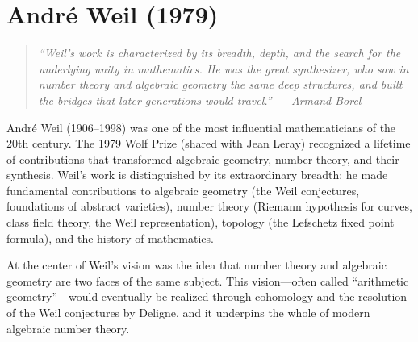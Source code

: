 \let\im\relax
\newcommand{\im}{\operatorname{im}}
\let\coker\relax
\newcommand{\coker}{\operatorname{coker}}
\let\Spec\relax
\newcommand{\Spec}{\operatorname{Spec}}
\let\Proj\relax
\newcommand{\Proj}{\operatorname{Proj}}
\let\Pic\relax
\newcommand{\Pic}{\operatorname{Pic}}
\let\Div\relax
\newcommand{\Div}{\operatorname{Div}}
\let\Gal\relax
\newcommand{\Gal}{\operatorname{Gal}}
\let\Frob\relax
\newcommand{\Frob}{\operatorname{Frob}}
\let\Cl\relax
\newcommand{\Cl}{\operatorname{Cl}}
\let\SL\relax
\newcommand{\SL}{\operatorname{SL}}
\let\GL\relax
\newcommand{\GL}{\operatorname{GL}}
\let\Sp\relax
\newcommand{\Sp}{\operatorname{Sp}}
\let\Sym\relax
\newcommand{\Sym}{\operatorname{Sym}}
\let\Norm\relax
\newcommand{\Norm}{\operatorname{Norm}}
\let\N\relax
\newcommand{\N}{\mathbb{N}}
\let\R\relax
\newcommand{\R}{\mathbb{R}}
\let\C\relax
\newcommand{\C}{\mathbb{C}}
\let\Q\relax
\newcommand{\Q}{\mathbb{Q}}
\let\Z\relax
\newcommand{\Z}{\mathbb{Z}}
\let\F\relax
\newcommand{\F}{\mathbb{F}}
\let\A\relax
\newcommand{\A}{\mathbb{A}}
\let\cL\relax
\newcommand{\cL}{\mathcal{L}}
\let\cO\relax
\newcommand{\cO}{\mathcal{O}}

\chapter{Andr\'{e} Weil (1979)}

\begin{quote}
\it ``Weil's work is characterized by its breadth, depth, and the search for the underlying unity in mathematics. He was the great synthesizer, who saw in number theory and algebraic geometry the same deep structures, and built the bridges that later generations would travel.'' --- Armand Borel
\end{quote}

Andr\'{e} Weil (1906--1998) was one of the most influential mathematicians of the 20th century. The 1979 Wolf Prize (shared with Jean Leray) recognized a lifetime of contributions that transformed algebraic geometry, number theory, and their synthesis. Weil's work is distinguished by its extraordinary breadth: he made fundamental contributions to algebraic geometry (the Weil conjectures, foundations of abstract varieties), number theory (Riemann hypothesis for curves, class field theory, the Weil representation), topology (the Lefschetz fixed point formula), and the history of mathematics.

At the center of Weil's vision was the idea that number theory and algebraic geometry are two faces of the same subject. This vision---often called ``arithmetic geometry''---would eventually be realized through %
cohomology and the resolution of the Weil conjectures by Deligne, and it underpins the whole of modern algebraic number theory.

